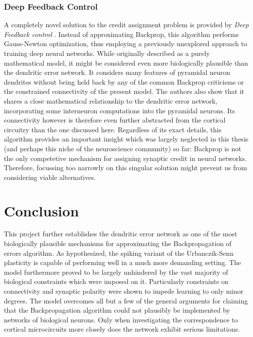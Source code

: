 \subsubsection*{Deep Feedback Control}

A completely novel solution to the credit assignment problem is provided by \textit{Deep Feedback
control} \citep{Meulemans2021,Meulemans2022}. Instead of approximating Backprop, this algorithm performs Gauss-Newton
optimization, thus employing a previously unexplored approach to training deep neural networks. While originally
described as a purely mathematical model, it might be considered even more biologically plausible than the dendritic
error network. It considers many features of pyramidal neuron dendrites without being held back by any of the common
Backprop criticisms or the constrained connectivity of the present model. The authors also show that it shares a close
mathematical relationship to the dendritic error network, incorporating some interneuron computations into the pyramidal
neurons. Its connectivity however is therefore even further abstracted from the cortical circuitry than the one
discussed here. Regardless of its exact details, this algorithm provides an important insight which was largely
neglected in this thesis (and perhaps this niche of the neuroscience community) so far: Backprop is not the only
competetive mechanism for assigning synaptic credit in neural networks. Therefore, focussing too narrowly on this
singular solution might prevent us from considering viable alternatives.



\section{Conclusion}

This project further establishes the dendritic error network as one of the most biologically plausible mechanisms for
approximating the Backpropagation of errors algorithm. As hypothesized, the spiking variant of the Urbanczik-Senn
plasticity is capable of performing well in a much more demanding setting. The model furthermore proved to be largely
unhindered by the vast majority of biological constraints which were imposed on it. Particularly constraints on
connectivity and synaptic polarity were shown to impede learning to only minor degrees. The model overcomes all but a
few of the general arguments for claiming that the Backpropagation algorithm could not plausibly be implemented by
networks of biological neurons. Only when investigating the correspondence to cortical microcircuits more closely does
the network exhibit serious limitations. 

